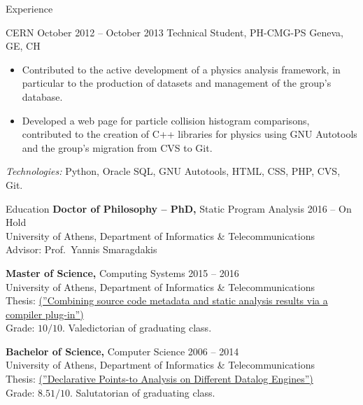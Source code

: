 \documentclass{resume}
\begin{document}
\begin{rSection}{Experience}
\begin{rSubsection}
  {CERN}
  {October 2012 -- October 2013}
  {Technical Student, PH-CMG-PS}
  {Geneva, GE, CH}

  \begin{itemize}[label={-}]
    \setlength\itemsep{-0.5em}
    \item Contributed to the active development of a physics analysis framework, in particular to the production of datasets and management of the group's database.
    \item Developed a web page for particle collision histogram comparisons, contributed to the creation of C++ libraries for physics using GNU Autotools and the group's migration from CVS to Git.
  \end{itemize}
  \footnotesize\textcolor{TechsColor}{\textit{Technologies:} Python, Oracle SQL, GNU Autotools, HTML, CSS, PHP, CVS, Git.}
\end{rSubsection}
\end{rSection}

\newpage
\begin{rSection}{Education}
  {\bf Doctor of Philosophy -- PhD,} Static Program Analysis \hfill {2016 -- On Hold } \\
  University of Athens,  Department of Informatics \& Telecommunications \\
  Advisor: Prof.~Yannis Smaragdakis

  {\bf Master of Science,} Computing Systems \hfill {2015 -- 2016 } \\
  University of Athens,  Department of Informatics \& Telecommunications \\
  Thesis: \href{http://cgi.di.uoa.gr/~smaragd/theses/antoniadis2.pdf}{ (''Combining source code metadata and static analysis results via a compiler plug-in'')} \\
  Grade: $10 / 10$. Valedictorian of graduating class.

  {\bf Bachelor of Science,}  Computer Science \hfill {2006 -- 2014}  \\
  University of Athens,  Department of Informatics \& Telecommunications \\
  Thesis: \href{http://cgi.di.uoa.gr/~smaragd/theses/antoniadis.pdf}{ (''Declarative Points-to Analysis on Different Datalog Engines'')} \\
  Grade: $8.51 / 10$. Salutatorian of graduating class.
\end{rSection}
\end{document}
